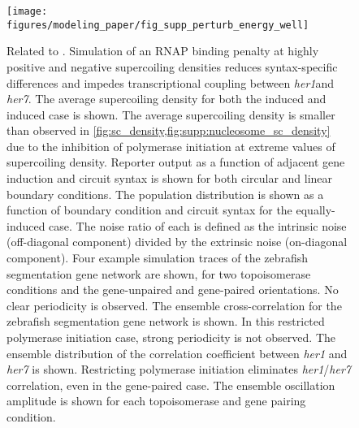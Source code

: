 \documentclass[11pt]{article} %
\begin{document}
\begin{figure}[htbp]
    \centering
    {\texttt{[image: figures/modeling\_paper/fig\_supp\_perturb\_energy\_well]}
    \label{fig:supp:energy_well_sc_density}
    \label{fig:supp:energy_well_induction_sweep}
    \label{fig:supp:energy_well_joint_distribution}
    \label{fig:supp:energy_well_zinani_examples}
    \label{fig:supp:energy_well_zinani_crosscorr}
    \label{fig:supp:energy_well_zinani_correlation_coefficient}
    \label{fig:supp:energy_well_zinani_oscillation_amplitude}
    }
\end{figure}
\begin{figure}
    \ContinuedFloat
    \caption{Related to .
        Simulation of an RNAP binding penalty at highly positive and negative supercoiling densities reduces syntax-specific differences and impedes transcriptional coupling between \textit{her1}and \textit{her7}.
         The average supercoiling density for both the induced and induced case is shown. The average supercoiling density is smaller than observed in \cref{fig:sc_density,fig:supp:nucleosome_sc_density} due to the inhibition of polymerase initiation at extreme values of supercoiling density.
         Reporter output as a function of adjacent gene induction and circuit syntax is shown for both circular and linear boundary conditions.
         The population distribution is shown as a function of boundary condition and circuit syntax for the equally-induced case. The noise ratio of each is defined as the intrinsic noise (off-diagonal component) divided by the extrinsic noise (on-diagonal component).
         Four example simulation traces of the zebrafish segmentation gene network are shown, for two topoisomerase conditions and the gene-unpaired and gene-paired orientations. No clear periodicity is observed.
         The ensemble cross-correlation for the zebrafish segmentation gene network is shown. In this restricted polymerase initiation case, strong periodicity is not observed.
         The ensemble distribution of the correlation coefficient between \textit{her1} and \textit{her7} is shown. Restricting polymerase initiation eliminates \emph{her1}/\emph{her7} correlation, even in the gene-paired case.
         The ensemble oscillation amplitude is shown for each topoisomerase and gene pairing condition.
    }
    \label{fig:top:supp_perturb_energy_well}
\end{figure}
\end{document}
